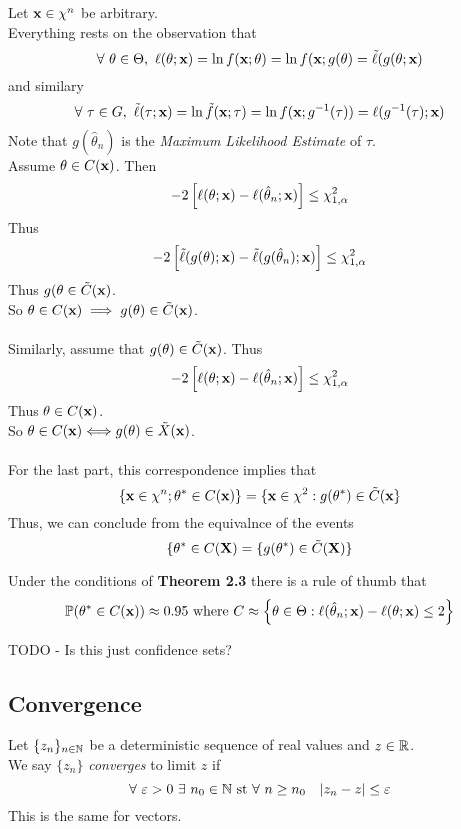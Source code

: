 \documentclass[11pt,a4paper]{article}
\begin{document}
Let $\textbf{x}\in\chi^n$ be arbitrary.\\
Everything rests on the observation that
$$\forall\ \theta\in\Theta,\ \ell(\theta;\textbf{x})=\ln f(\textbf{x};\theta)=\ln f(\textbf{x};g(\theta)=\tilde\ell(g(\theta;\textbf{x})$$
and similary
$$\forall\ \tau\in G,\ \tilde\ell(\tau;\x)=\ln \tilde{f}(\x;\tau)=\ln f(\x;g^{-1}(\tau))=\ell(g^{-1}(\tau);\x)$$
Note that $g(\hat\theta_n)$ is the \textit{Maximum Likelihood Estimate} of $\tau$.\\
Assume $\theta\in C(\textbf{x})$. Then
$$-2\left[\ell(\theta;\textbf{x})-\ell(\hat\theta_n;\textbf{x})\right]\leq\chi^2_{1,\alpha}$$
Thus
$$-2\left[\tilde\ell(g(\theta);\textbf{x})-\tilde\ell(g(\hat\theta_n);\textbf{x})\right]\leq\chi^2_{1,\alpha}$$
Thus $g(\theta\in\tilde{C}(\textbf{x})$.\\
So $\theta\in C(\textbf{x})\implies g(\theta)\in\tilde{C}(\textbf{x})$.\\
\\
Similarly, assume that $g(\theta)\in\tilde{C}(\textbf{x})$. Thus
$$-2\left[\ell(\theta;\textbf{x})-\ell(\hat\theta_n;\textbf{x})\right]\leq\chi^2_{1,\alpha}$$
Thus $\theta\in C(\textbf{x})$.\\
So $\theta\in C(\textbf{x})\Longleftrightarrow g(\theta)\in\tilde{X}(\textbf{x})$.\\
\\
For the last part, this correspondence implies that
$$\{\textbf{x}\in\chi^n;\theta^*\in C(\textbf{x})\}=\{\textbf{x}\in\chi^2:g(\theta^*)\in\tilde{C}(\textbf{x}\}$$
Thus, we can conclude from the equivalnce of the events
$$\{\theta^*\in C(\textbf{X})=\{g(\theta^*)\in\tilde{C}(\textbf{X})\}$$

Under the conditions of \textbf{Theorem 2.3} there is a rule of thumb that
$$\mathbb{P}(\theta^*\in C(\textbf{x}))\approx0.95\text{ where }C\approx\left\{\theta\in\Theta:\ell(\hat\theta_n;\textbf{x})-\ell(\theta;\textbf{x})\leq2\right\}$$

TODO - Is this just confidence sets?

\subsection{Convergence}

Let $\{z_n\}_{n\in\mathbb{N}}$ be a deterministic sequence of real values and $z\in\mathbb{R}$.\\
We say $\{z_n\}$ \textit{converges} to limit $z$ if
$$\forall\ \varepsilon>0\ \exists\ n_0\in\nats\text{ st }\forall\ n\geq n_0\quad |z_n-z|\leq\varepsilon$$
\nb This is the same for vectors.\\
\end{document}
